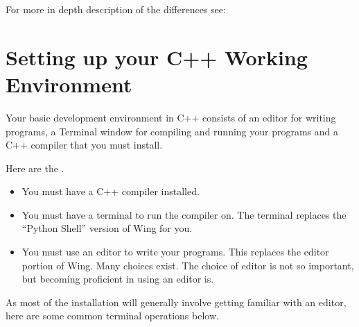 \documentclass[letterpaper,10pt,english]{sphinxmanual}
\begin{document}
For more in depth description of the differences see:
\begin{quote}


\end{quote}


\section{Setting up your C++ Working Environment}
\label{\detokenize{lecture_notes/transition:setting-up-your-c-working-environment}}
Your basic development environment in C++ consists of an editor for
writing programs, a Terminal window for compiling and running your
programs and a C++ compiler that you must install.

Here are the .
\begin{itemize}
\item {} 
You must have a C++ compiler installed.

\item {} 
You must have a terminal to run the compiler on. The terminal
replaces the “Python Shell” version of Wing for you.

\item {} 
You must use an editor to write your programs. This replaces the
editor portion of Wing. Many choices exist. The choice of editor is
not so important, but becoming proficient in using an editor is.

\end{itemize}

As most of the installation will generally involve getting familiar
with an editor, here are some common terminal operations below.
\end{document}
